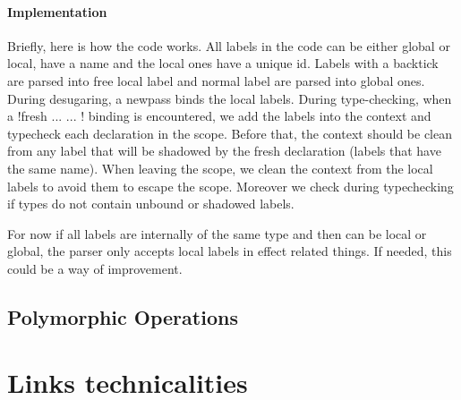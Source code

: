 \documentclass[11pt, nonacm=true, language=french, language=english]{acmart}
\begin{document}
\paragraph{Implementation}
Briefly, here is how the code works. All labels in the code can be either global or local, have a name and the local ones have a unique id. Labels with a backtick are parsed into free local label and normal label are parsed into global ones. During desugaring, a newpass binds the local labels. During type-checking, when a !fresh ... { ... }! binding is encountered, we add the labels into the context and typecheck each declaration in the scope. Before that, the context should be clean from any label that will be shadowed by the fresh declaration (labels that have the same name). When leaving the scope, we clean the context from the local labels to avoid them to escape the scope. Moreover we check during typechecking if types do not contain unbound or shadowed labels.

\begin{rem}
  For now if all labels are internally of the same type and then can be local or global, the parser only accepts local labels in effect related things. If needed, this could be a way of improvement.
\end{rem}


\subsection{Polymorphic Operations}




































\appendix

\section{Links technicalities}
\label{sec:tech}
\end{document}
